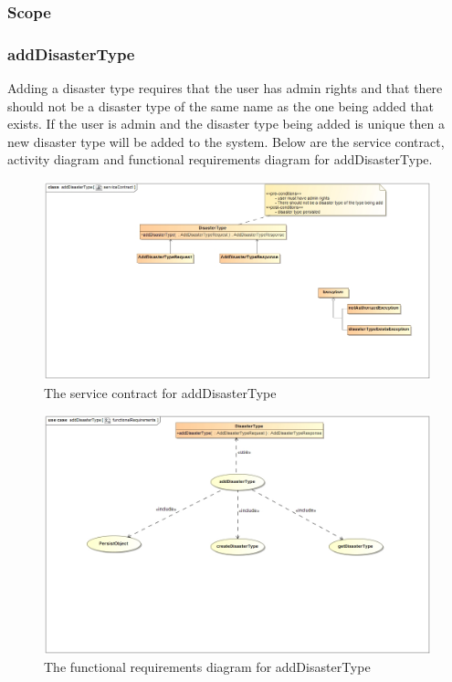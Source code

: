 \subsubsection{Scope}


\subsubsection{addDisasterType}

Adding a disaster type requires that the user has admin rights and that there should not be a disaster type of the same name as the one being added that exists. If the user is admin and the disaster type being added is unique then a new disaster type will be added to the system. Below are the service contract, activity diagram and functional requirements diagram for addDisasterType.

\begin{figure}[H]
	\centering
	\includegraphics[width=1.0\textwidth]{../images/addDisasterTypeServiceContract.jpg}
	\caption{The service contract for addDisasterType \label{overflow}}
\end{figure}

\begin{figure}[H]
	\centering
	\includegraphics[width=1.0\textwidth]{../images/AddDisasterTypeFunctionalRequirements.jpg}
	\caption{The functional requirements diagram for addDisasterType \label{overflow}}
\end{figure}

